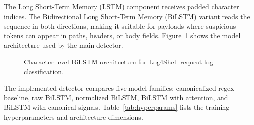 \documentclass[conference]{IEEEtran}
\begin{document}
The Long Short-Term Memory (LSTM) component receives padded character indices.
The Bidirectional Long Short-Term Memory (BiLSTM) variant reads the sequence in
both directions, making it suitable for payloads where suspicious tokens can
appear in paths, headers, or body fields. Figure~\ref{fig:model} shows the
model architecture used by the main detector.

\begin{figure}[!t]
\centering
{}
\caption{Character-level BiLSTM architecture for Log4Shell request-log classification.}
\label{fig:model}
\end{figure}

The implemented detector compares five model families: canonicalized regex
baseline, raw BiLSTM, normalized BiLSTM, BiLSTM with attention, and BiLSTM with
canonical signals. Table~\ref{tab:hyperparams} lists the training
hyperparameters and architecture dimensions.
\end{document}
